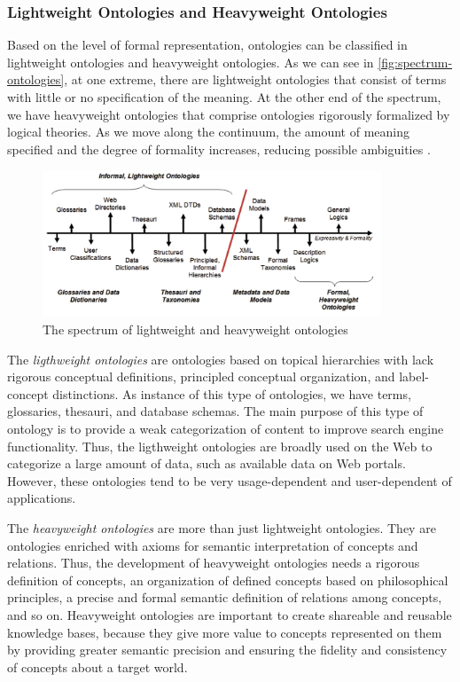 \subsubsection{Lightweight Ontologies and Heavyweight Ontologies}
\label{subsubsec:lightweight-ontologies}

Based on the level of formal representation, ontologies can be classified in lightweight ontologies and heavyweight ontologies. As we can see in \autoref{fig:spectrum-ontologies}, at one extreme, there are lightweight ontologies that consist of terms with little or no specification of the meaning.
At the other end of the spectrum, we have heavyweight ontologies that comprise ontologies rigorously formalized by logical theories.
As we move along the continuum, the amount of meaning specified and the degree of formality increases, reducing possible ambiguities \cite{UscholdGruninger2004}.

\begin{figure}[htb]
 \caption{The spectrum of lightweight and heavyweight ontologies}
 \label{fig:spectrum-ontologies}
 \centering
 \includegraphics[width=0.9\textwidth]{images/chap-general-background/spectrum-ontologies.png}
\end{figure}

The \emph{ligthweight ontologies} are ontologies based on topical hierarchies with lack rigorous conceptual definitions, principled conceptual organization, and label-concept distinctions.
As instance of this type of ontologies, we have terms, glossaries, thesauri, and database schemas.
The main purpose of this type of ontology is to provide a weak categorization of content to improve search engine functionality.
Thus, the ligthweight ontologies are broadly used on the Web to categorize a large amount of data, such as available data on Web portals.
However, these ontologies tend to be very usage-dependent and user-dependent of applications.

The \emph{heavyweight ontologies} are more than just lightweight ontologies.
They are ontologies enriched with axioms for semantic interpretation of concepts and relations.
Thus, the development of heavyweight ontologies needs a rigorous definition of concepts, an organization of defined concepts based on philosophical principles, a precise and formal semantic definition of relations among concepts, and so on.
Heavyweight ontologies are important to create shareable and reusable knowledge bases, because they give more value to concepts represented on them by providing greater semantic precision and ensuring the fidelity and consistency of concepts about a target world.

